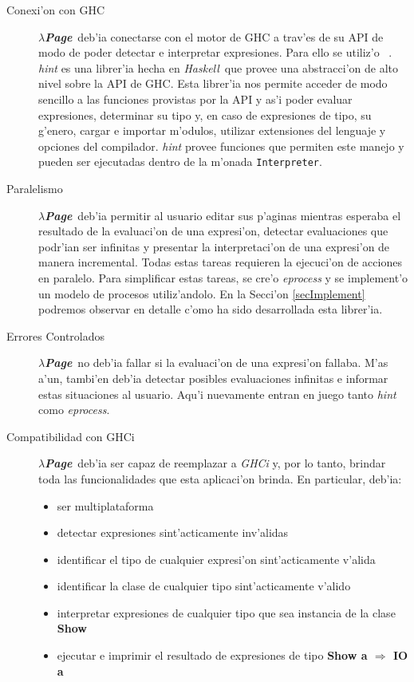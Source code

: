 \documentclass[a4paper]{article}
\newcommand{\haskell}{\textsl{Haskell}}
\newcommand{\hpage}{\textbf{\textsl{$\lambda$Page}}}
\begin{document}
\begin{description}
\item[Conexi'on con GHC] \hpage\ deb'ia conectarse con el motor de GHC a trav'es de su API de modo de poder detectar e interpretar expresiones.  Para ello se utiliz'o ~\cite{hint}.  \textsl{hint} es una librer'ia hecha en \haskell\ que provee una abstracci'on de alto nivel sobre la API de GHC.  Esta librer'ia nos permite acceder de modo sencillo a las funciones provistas por la API y as'i poder evaluar expresiones, determinar su tipo y, en caso de expresiones de tipo, su g'enero, cargar e importar m'odulos, utilizar extensiones del lenguaje y opciones del compilador.  \textsl{hint} provee funciones que permiten este manejo y pueden ser ejecutadas dentro de la m'onada \texttt{Interpreter}.
\item[Paralelismo] \hpage\ deb'ia permitir al usuario editar sus p'aginas mientras esperaba el resultado de la evaluaci'on de una expresi'on, detectar evaluaciones que podr'ian ser infinitas y presentar la interpretaci'on de una expresi'on de manera incremental.  Todas estas tareas requieren la ejecuci'on de acciones en paralelo.  Para simplificar estas tareas, se cre'o \textsl{eprocess} y se implement'o un modelo de procesos utiliz'andolo.  En la Secci'on \ref{secImplement} podremos observar en detalle c'omo ha sido desarrollada esta librer'ia.
\item[Errores Controlados] \hpage\ no deb'ia fallar si la evaluaci'on de una expresi'on fallaba.  M'as a'un, tambi'en deb'ia detectar posibles evaluaciones infinitas e informar estas situaciones al usuario.  Aqu'i nuevamente entran en juego tanto \textsl{hint} como \textsl{eprocess}.
\item[Compatibilidad con GHCi] \hpage\ deb'ia ser capaz de reemplazar a \textsl{GHCi} y, por lo tanto, brindar toda las funcionalidades que esta aplicaci'on brinda.  En particular, deb'ia:
	\begin{itemize}
		\item ser multiplataforma
		\item detectar expresiones sint'acticamente inv'alidas
		\item identificar el tipo de cualquier expresi'on sint'acticamente v'alida
		\item identificar la clase de cualquier tipo sint'acticamente v'alido
		\item interpretar expresiones de cualquier tipo que sea instancia de la clase \textbf{Show}
		\item ejecutar e imprimir el resultado de expresiones de tipo \textbf{Show a $\Rightarrow$ IO a}
	\end{itemize}
\end{description}
\end{document}
